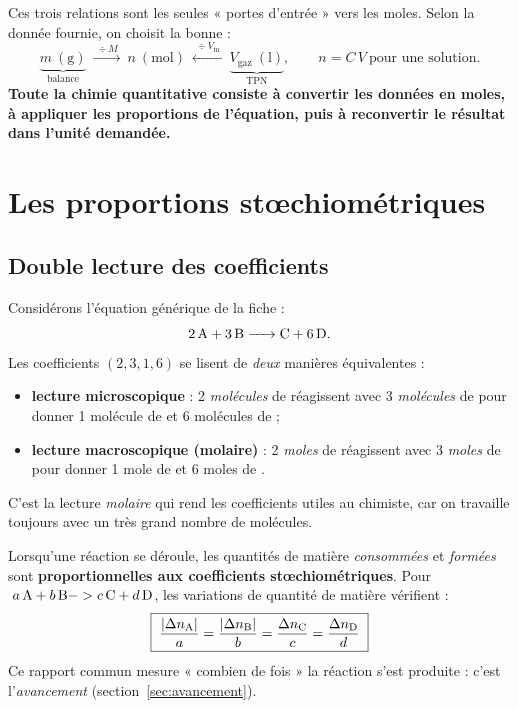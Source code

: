 \documentclass[11pt,a4paper]{article}
\newcommand{\Vm}{V_{\mathrm{m}}}          %
\begin{document}
\begin{remarque}
Ces trois relations sont les seules « portes d'entrée » vers les moles. Selon la donnée fournie,
on choisit la bonne :
\[
\underbrace{m\ (\si{\gram})}_{\text{balance}}\ \xrightarrow{\;\div M\;}\ n\ (\si{\mole})\ \xleftarrow{\;\div \Vm\;}\ \underbrace{V_{\text{gaz}}\ (\si{\litre})}_{\text{TPN}},
\qquad
n=C\,V\ \text{pour une solution.}
\]
\textbf{Toute la chimie quantitative consiste à convertir les données en moles, à appliquer les
proportions de l'équation, puis à reconvertir le résultat dans l'unité demandée.}
\end{remarque}

\section{Les proportions stœchiométriques}
\label{sec:propor}
\subsection{Double lecture des coefficients}

Considérons l'équation générique de la fiche :
\[
\ce{2 A + 3 B -> C + 6 D}.
\]
Les coefficients $(2,3,1,6)$ se lisent de \emph{deux} manières équivalentes :
\begin{itemize}[leftmargin=1.6em,topsep=2pt,itemsep=2pt]
  \item \textbf{lecture microscopique} : 2 \emph{molécules} de  réagissent avec 3
        \emph{molécules} de  pour donner 1 molécule de  et 6 molécules de  ;
  \item \textbf{lecture macroscopique (molaire)} : 2 \emph{moles} de  réagissent avec 3
        \emph{moles} de  pour donner 1 mole de  et 6 moles de .
\end{itemize}
C'est la lecture \emph{molaire} qui rend les coefficients utiles au chimiste, car on travaille
toujours avec un très grand nombre de molécules.

\begin{theoreme}
Lorsqu'une réaction se déroule, les quantités de matière \emph{consommées} et \emph{formées} sont
\textbf{proportionnelles aux coefficients stœchiométriques}. Pour
$\;a\,\ce{A} + b\,\ce{B} -> c\,\ce{C} + d\,\ce{D}$, les variations de quantité de matière vérifient :
\[
\boxed{\;\dfrac{|\Delta n_{\ce{A}}|}{a}=\dfrac{|\Delta n_{\ce{B}}|}{b}=\dfrac{\Delta n_{\ce{C}}}{c}=\dfrac{\Delta n_{\ce{D}}}{d}\;}
\]
Ce rapport commun mesure « combien de fois » la réaction s'est produite : c'est l'\emph{avancement}
(section~\ref{sec:avancement}).
\end{theoreme}
\end{document}

